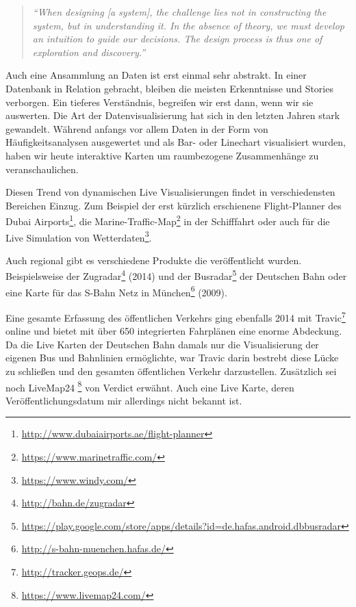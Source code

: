\begin{newpage}
		\begin{quote}
			\emph{"`When designing [a system], the challenge lies not in constructing the system, but in understanding it. In the absence of theory, we must develop an intuition to guide our decisions. The design process is thus one of exploration and discovery."'} \parencite{victor}
		\end{quote}

		Auch eine Ansammlung an Daten ist erst einmal sehr abstrakt. In einer Datenbank in Relation gebracht, bleiben die meisten Erkenntnisse und Stories verborgen. Ein tieferes Verständnis, begreifen wir erst dann, wenn wir sie auswerten. Die Art der Datenvisualisierung hat sich in den letzten Jahren stark gewandelt. Während anfangs vor allem Daten in der Form von Häufigkeitsanalysen ausgewertet und als Bar- oder Linechart visualisiert wurden, haben wir heute interaktive Karten um raumbezogene Zusammenhänge zu veranschaulichen.

		Diesen Trend von dynamischen Live Visualisierungen findet in verschiedensten Bereichen Einzug. Zum Beispiel der erst kürzlich erschienene Flight-Planner des Dubai Airports\footnote{\url{http://www.dubaiairports.ae/flight-planner}}, die Marine-Traffic-Map\footnote{\url{https://www.marinetraffic.com/}} in der Schifffahrt oder auch für die Live Simulation von Wetterdaten\footnote{\url{https://www.windy.com/}}. 

		Auch regional gibt es verschiedene Produkte die veröffentlicht wurden. Beispielsweise der Zugradar\footnote{\url{http://bahn.de/zugradar}} (2014) und der Busradar\footnote{\url{https://play.google.com/store/apps/details?id=de.hafas.android.dbbusradar}} der Deutschen Bahn oder eine Karte für das S-Bahn Netz in München\footnote{\url{http://s-bahn-muenchen.hafas.de/}} (2009).

		Eine gesamte Erfassung des öffentlichen Verkehrs ging ebenfalls 2014 mit Travic\footnote{\url{http://tracker.geops.de/}}\label{travic} online und bietet mit über 650 integrierten Fahrplänen eine enorme Abdeckung. Da die Live Karten der Deutschen Bahn damals nur die Visualisierung der eigenen Bus und Bahnlinien ermöglichte, war Travic darin bestrebt diese Lücke zu schließen und den gesamten öffentlichen Verkehr darzustellen. 
		Zusätzlich sei noch LiveMap24 \footnote{\url{https://www.livemap24.com/}} von Verdict erwähnt. Auch eine Live Karte, deren Veröffentlichungsdatum mir allerdings nicht bekannt ist.


\end{newpage}
